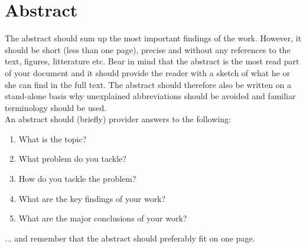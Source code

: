 \chapter*{Abstract}
The abstract should sum up the most important findings of the work. However, it should be short (less than one page), precise and without any references to the text, figures, litterature etc. Bear in mind that the abstract is the most read part of your document and it should provide the reader with a sketch of what he or she can find in the full text. The abstract should therefore also be written on a stand-alone basis why unexplained abbreviations should be avoided and familiar terminology should be used.\\

\noindent An abstract should (briefly) provider answers to the following:\\

\begin{enumerate}
  \item What is the topic?
  \item What problem do you tackle?
  \item How do you tackle the problem?
  \item What are the key findings of your work?
  \item What are the major conclusions of your work?
\end{enumerate}

\noindent ... and remember that the abstract should preferably fit on one page. 

